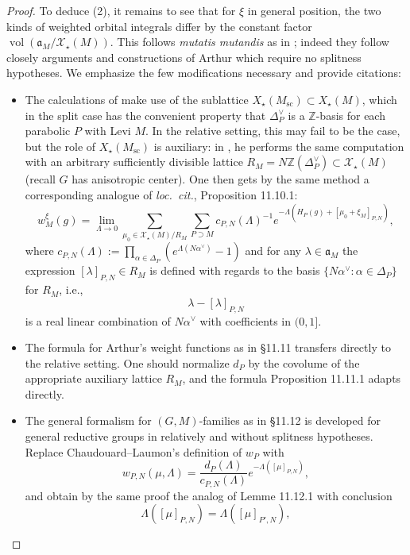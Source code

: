 \documentclass[openany]{amsbook}
\theoremstyle{definition}
\theoremstyle{remark}
\numberwithin{equation}{section}
\newcommand{\Z}{\mathbb{Z}}
\newcommand{\cX}{\mathcal{X}}
\newcommand{\vol}{\operatorname{vol}}
\renewcommand{\-}{\operatorname{-}}
\renewcommand{\a}{\mathfrak{a}}
\renewcommand{\sc}{\mathrm{sc}}
\begin{document}
\begin{proof}
    To deduce (2), it remains to see that for $\xi$ in general position, the two kinds of weighted orbital integrals differ by the constant factor $\vol(\a_M/\cX_\star(M))$. This follows \emph{mutatis mutandis} as in \cite[\S 11.10-13]{CLI}; indeed they follow closely arguments and constructions of Arthur which require no splitness hypotheses. We emphasize the few modifications necessary and provide citations:
    \begin{itemize}
        \item The calculations of \cite[\S 11.10]{CLI} make use of the sublattice $X_\star(M_{\sc}) \subset X_\star(M)$, which in the split case has the convenient property that $\Delta_P^\vee$ is a $\Z$-basis for each parabolic $P$ with Levi $M$. In the relative setting, this may fail to be the case, but the role of $X_\star(M_{\sc})$ is auxiliary: in \cite[\S 6]{arthurlocalTF}, he performs the same computation with an arbitrary sufficiently divisible lattice $R_M = N \Z(\Delta_P^\vee) \subset \cX_\star(M)$ (recall $G$ has anisotropic center). One then gets by the same method a corresponding analogue of \emph{loc.\ cit.}, Proposition 11.10.1:
        $$
            w_M^\xi(g) = \lim_{\Lambda \to 0} \sum_{\mu_0 \in \cX_\star(M)/R_M} \sum_{P \supset M} c_{P,N}(\Lambda)^{-1} e^{-\Lambda(H_P(g) + [\mu_0 + \xi_M]_{P,N})},
        $$
        where $c_{P,N}(\Lambda) := \prod_{\alpha \in \Delta_P} \left(e^{\Lambda(N \alpha^\vee)} - 1\right)$ and for any $\lambda \in \a_M$ the expression $[\lambda]_{P,N} \in R_M$ is defined with regards to the basis $\{N \alpha^\vee : \alpha \in \Delta_P\}$ for $R_M$, i.e.,
        $$
            \lambda - [\lambda]_{P,N}
        $$
        is a real linear combination of $N \alpha^\vee$ with coefficients in $(0, 1]$. 
        \item The formula for Arthur's weight functions as in \S 11.11 transfers directly to the relative setting. One should normalize $d_P$ by the covolume of the appropriate auxiliary lattice $R_M$, and the formula Proposition 11.11.1 adapts directly. 
        \item The general formalism for $(G,M)$-families as in \S 11.12 is developed for general reductive groups in \cite{ArthurGMFamilies} relatively and without splitness hypotheses. Replace Chaudouard--Laumon's definition of $w_P$ with
        $$
            w_{P,N}(\mu, \Lambda) = \frac{d_P(\Lambda)}{c_{P,N}(\Lambda)} e^{-\Lambda([\mu]_{P,N})},
        $$
        and obtain by the same proof the analog of Lemme 11.12.1 with conclusion
        $$
            \Lambda([\mu]_{P,N}) = \Lambda([\mu]_{P',N}),
$$
\end{itemize}
\end{proof}
\end{document}
